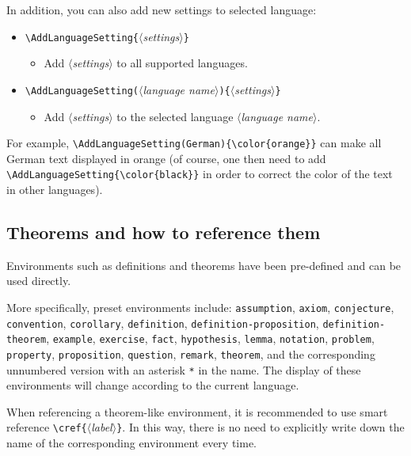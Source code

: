 \documentclass{minimart}
\providecommand{\meta}[1]{$\langle${\normalfont\itshape#1}$\rangle$}
\begin{document}
\medskip
In addition, you can also add new settings to selected language:
\begin{itemize}
    \item \lstinline|\AddLanguageSetting{|\meta{settings}\lstinline|}|
    \begin{itemize}
        \item Add \meta{settings} to all supported languages.
    \end{itemize}
    \item \lstinline|\AddLanguageSetting(|\meta{language name}\lstinline|){|\meta{settings}\lstinline|}|
    \begin{itemize}
        \item Add \meta{settings} to the selected language \meta{language name}.
    \end{itemize}
\end{itemize}
For example, \lstinline|\AddLanguageSetting(German){\color{orange}}| can make all German text displayed in orange (of course, one then need to add \lstinline|\AddLanguageSetting{\color{black}}| in order to correct the color of the text in other languages).


\subsection{Theorems and how to reference them}

Environments such as definitions and theorems have been pre-defined and can be used directly. 

More specifically, preset environments include: 
\texttt{assumption}, \texttt{axiom}, \texttt{conjecture}, \texttt{convention}, \texttt{corollary}, \texttt{definition}, \texttt{definition-proposition}, \texttt{definition-theorem}, \texttt{example}, \texttt{exercise}, \texttt{fact}, \texttt{hypothesis}, \texttt{lemma}, \texttt{notation}, \texttt{problem}, \texttt{property}, \texttt{proposition}, \texttt{question}, \texttt{remark}, \texttt{theorem}, and the corresponding unnumbered version with an asterisk \lstinline|*| in the name. The display of these environments will change according to the current language.

When referencing a theorem-like environment, it is recommended to use smart reference \lstinline|\cref{|\meta{label}\texttt{\}}. In this way, there is no need to explicitly write down the name of the corresponding environment every time.
\end{document}
